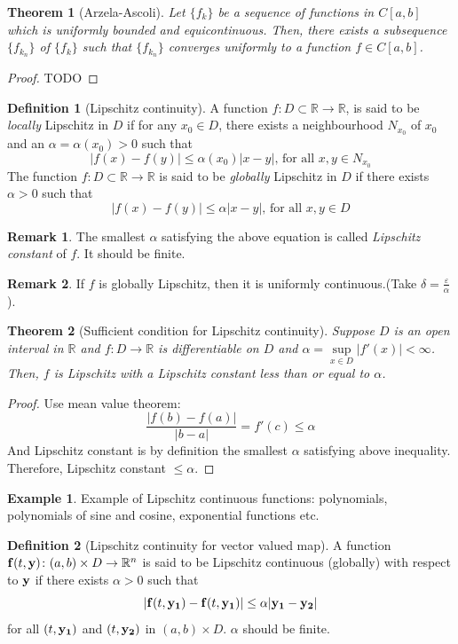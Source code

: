 \documentclass[12pt,reqno]{amsart}
\theoremstyle{plain}
\newtheorem{thm}{Theorem}
\theoremstyle{definition}
\newtheorem{defn}{Definition}
\newtheorem{eg}{Example}
\newtheorem{rem}{Remark}
\begin{document}
\begin{thm}[Arzela-Ascoli]
    Let $\{f_k\}$ be a sequence of functions in $C[a,b]$ which is uniformly bounded and equicontinuous. Then, there exists a subsequence $\{f_{k_n}\}$ of $\{f_k\}$ such that $\{f_{k_n}\}$ converges uniformly to a function $f \in  C[a,b]$.
\end{thm}
\begin{proof}
  TODO
\end{proof}
\begin{defn}[Lipschitz continuity]
    A function $f \colon D \subset \mathbb{R} \to \mathbb{R}$, is said to be {\it locally} Lipschitz in $D$ if for any $x_0 \in D$, there exists a neighbourhood $N_{x_0}$ of $x_0$ and an $\alpha = \alpha(x_0) > 0$ such that 
    $$ |f(x) - f(y)| \leq \alpha(x_0)|x - y|\text{, for all } x,y 
    \in N_{x_0}$$
    The function $f \colon D \subset 
    \mathbb{R} \to \mathbb{R}$ is said to be {\it globally} Lipschitz in $D$ if there exists $\alpha > 0$ such that 
    $$|f(x) - f(y)| \leq \alpha|x - y|\text{, for all } x,y 
    \in D$$       
\end{defn}
\begin{rem}
    The smallest $\alpha$ satisfying the above equation is called {\it Lipschitz constant} of $f$. It should be finite.
\end{rem}
\begin{rem}
    If $f$ is globally Lipschitz, then it is uniformly continuous.(Take $\delta = \frac{\varepsilon}{\alpha}$).
\end{rem}
\begin{thm}[Sufficient condition for Lipschitz continuity]
    Suppose $D$ is an open interval in $\mathbb{R}$ and $f \colon D \to \mathbb{R}$ is differentiable on $D$ and $\alpha = \sup\limits_{x \in D}|f'(x)| < \infty$. Then, $f$ is Lipschitz with a Lipschitz constant less than or equal to $\alpha$.
\end{thm}
\begin{proof}
    Use mean value theorem: 
    $$ \frac{|f(b) - f(a)|}{|b - a|} = f'(c) \leq \alpha$$
    And Lipschitz constant is by definition the smallest $\alpha$ satisfying above inequality. Therefore, Lipschitz constant $\leq \alpha$.
\end{proof}
\begin{eg}
    Example of Lipschitz continuous functions: polynomials, polynomials of sine and cosine, exponential functions etc.
\end{eg}
\begin{defn}[Lipschitz continuity for vector valued map]
    A function ${\bf f}(t,{\bf y}) \colon (a,b) \times D \to \mathbb{R}^n$ is said to be Lipschitz continuous (globally) with respect to ${\bf y}$ if there exists $\alpha > 0$ such that
    $$ |{\bf f}(t, {\bf y_1}) - {\bf f}(t, {\bf y_1})| \leq \alpha|{\bf y_1 - y_2}|$$
    for all $(t, {\bf y_1})$ and $(t, {\bf y_2})$ in $(a,b) \times D$. $\alpha$ should be finite.
\end{defn}
\end{document}
